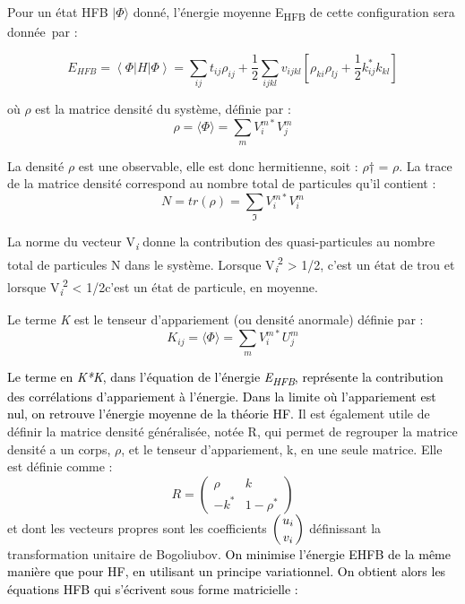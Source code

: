 Pour un état HFB $ | \Phi \rangle $ donné, l'énergie moyenne E\textsubscript{HFB} de cette configuration sera
donnée~par :

 \begin{equation}E_{\mathit{HFB}}=\left\langle \Phi \left|H\left|\Phi \right.\right.\right\rangle =\sum
_{\mathit{ij}}t_{\mathit{ij}}\rho _{\mathit{ij}}+\frac 1 2\sum _{\mathit{ijkl}}v_{\mathit{ijkl}}\left[\rho
_{\mathit{ki}}\rho _{\mathit{lj}}+\frac 1 2k_{\mathit{ij}}^{\ast }k_{\mathit{kl}}\right]\end{equation} 

où $\rho $ est la matrice densité du système, définie par :
 \begin{equation}
\rho = \langle \Phi \rangle  =\sum _m V_i^{m\ast
}V_j^m
\end{equation}

La densité $\rho $ est une observable, elle est donc hermitienne, soit : $\rho $† = $\rho $. La trace de la matrice
densité correspond au nombre total de particules qu'il contient :
 \begin{equation} N=\mathit{tr}\left(\rho \right)=\sum _{\Im }V_i^{m\ast
}V_i^m\end{equation} 

La norme du vecteur V\textit{\textsubscript{i}} donne la contribution des quasi-particules au nombre total de particules
N dans le système. Lorsque {\textbar}V\textit{\textsubscript{i}}{\textbar}\textsuperscript{2} {\textgreater} 1/2, c'est
un état de trou et lorsque {\textbar}V\textit{\textsubscript{i}}{\textbar}\textsuperscript{2} {\textless} 1/2c'est un
état de particule, en moyenne.

Le terme \textit{K} est le tenseur d'appariement (ou densité anormale) définie par :
 \begin{equation}K_{\mathit{ij}}=\langle \Phi \rangle =\sum _mV_i^{m\ast}U_j^m
\end{equation}

\textcolor{black}{Le terme en }\textit{\textcolor{black}{K*K}}\textcolor{black}{, dans l'équation de l'énergie
}\textit{\textcolor{black}{E}}\textit{\textcolor{black}{\textsubscript{HFB}}}\textcolor{black}{, représente la
contribution des corrélations d'appariement à l'énergie. Dans la limite où l'appariement est nul, on retrouve l'énergie
moyenne de la théorie HF.}
Il est également utile de définir la matrice densité généralisée, notée R, qui permet de regrouper la matrice densité a
un corps, $\rho $, et le tenseur d'appariement, k, en une seule matrice. Elle est définie comme :
 \begin{equation}R=\left(\begin{matrix}\rho
&k\\-k^{\ast }&1-\rho ^{\ast
}\end{matrix}\right)\end{equation}
et dont les vecteurs propres sont les coefficients $\left(\genfrac{}{}{0pt}{0}{u_i}{v_i}\right)$ définissant la
transformation unitaire de Bogoliubov.
\textcolor{black}{ On minimise l'énergie EHFB de la même manière que pour HF, en utilisant un principe
variationnel. On obtient alors les équations HFB qui s'écrivent sous forme matricielle :}
\textcolor{black}{}

